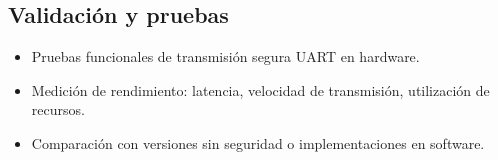 \subsection{ Validación y pruebas}

\begin{itemize}
\item Pruebas funcionales de transmisión segura UART en hardware.
\item Medición de rendimiento: latencia, velocidad de transmisión, utilización de recursos.
\item Comparación con versiones sin seguridad o implementaciones en software.
\end{itemize}

\subsection{ }





\endinput 